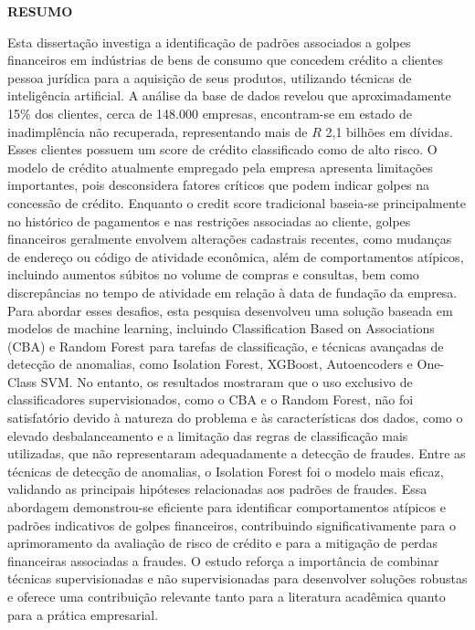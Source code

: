 \documentclass[12pt,a4paper]{article}
\begin{document}
\newpage
\thispagestyle{plain}
\begin{center}
\large
\textbf{RESUMO}
\end{center}
\renewcommand{\baselinestretch}{0.6666666}
Esta dissertação investiga a identificação de padrões associados a golpes financeiros em indústrias de bens de consumo que concedem crédito a clientes pessoa jurídica para a aquisição de seus produtos, utilizando técnicas de inteligência artificial. A análise da base de dados revelou que aproximadamente 15\% dos clientes, cerca de 148.000 empresas, encontram-se em estado de inadimplência não recuperada, representando mais de $R$ 2,1 bilhões em dívidas. Esses clientes possuem um score de crédito classificado como de alto risco. O modelo de crédito atualmente empregado pela empresa apresenta limitações importantes, pois desconsidera fatores críticos que podem indicar golpes na concessão de crédito. Enquanto o credit score tradicional baseia-se principalmente no histórico de pagamentos e nas restrições associadas ao cliente, golpes financeiros geralmente envolvem alterações cadastrais recentes, como mudanças de endereço ou código de atividade econômica, além de comportamentos atípicos, incluindo aumentos súbitos no volume de compras e consultas, bem como discrepâncias no tempo de atividade em relação à data de fundação da empresa.
Para abordar esses desafios, esta pesquisa desenvolveu uma solução baseada em modelos de machine learning, incluindo Classification Based on Associations (CBA) e Random Forest para tarefas de classificação, e técnicas avançadas de detecção de anomalias, como Isolation Forest, XGBoost, Autoencoders e One-Class SVM. No entanto, os resultados mostraram que o uso exclusivo de classificadores supervisionados, como o CBA e o Random Forest, não foi satisfatório devido à natureza do problema e às características dos dados, como o elevado desbalanceamento e a limitação das regras de classificação mais utilizadas, que não representaram adequadamente a detecção de fraudes.
Entre as técnicas de detecção de anomalias, o Isolation Forest foi o modelo mais eficaz, validando as principais hipóteses relacionadas aos padrões de fraudes. Essa abordagem demonstrou-se eficiente para identificar comportamentos atípicos e padrões indicativos de golpes financeiros, contribuindo significativamente para o aprimoramento da avaliação de risco de crédito e para a mitigação de perdas financeiras associadas a fraudes. O estudo reforça a importância de combinar técnicas supervisionadas e não supervisionadas para desenvolver soluções robustas e oferece uma contribuição relevante tanto para a literatura acadêmica quanto para a prática empresarial.
\end{document}
